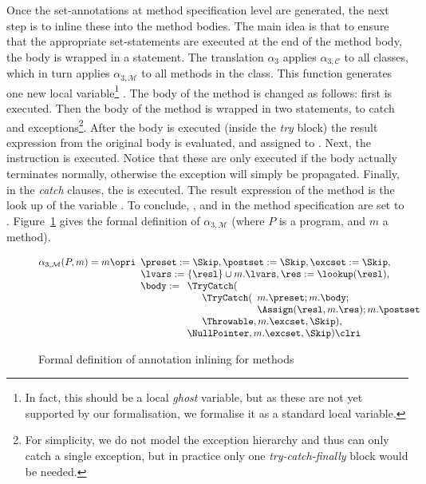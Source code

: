 Once the set-annotations at method specification level are generated,
the next step is to inline these into the method bodies.  The main
idea is that to ensure that the appropriate set-statements are
executed at the end of the method body, the body is wrapped in a
\TryCatch statement. The translation \(\alpha_3\) applies
\(\alpha_{3, \mathcal{C}}\) to all classes, which in turn applies
\(\alpha_{3, \mathcal{M}}\) to all methods in the class. This function
generates one new local variable\footnote{In fact, this should be a
local \emph{ghost} variable, but as these are not yet supported by our
formalisation, we formalise it as a standard local variable.}
\resl. The body of the method is changed as follows: first \preset is
executed. Then the body of the method is wrapped in two \TryCatch
statements, to catch \Throwable and \NullPointer
exceptions\footnote{For simplicity, we do not model the exception
hierarchy and thus \TryCatch can only catch a single exception, but in
practice only one \emph{try-catch-finally} block would be needed.}.  After
the body is executed (inside the \emph{try} block) the result
expression from the original body is evaluated, and assigned to
\resl. Next, the \postset instruction is executed. Notice that these
are only executed if the body actually terminates normally, otherwise
the exception will simply be propagated. Finally, in the \emph{catch}
clauses, the \excset is executed. The result expression of the method
is the look up of the variable \resl. To conclude, \preset,
\postset and
\excset in the method specification are set to
\Skip. Figure~\ref{FigInline} gives the formal definition of
\(\alpha_{3, \mathcal{M}}\) (where \(P\) is a program, and \(m\) a method).

\begin{figure}[t]
\[
\alpha_{3, \mathcal{M}}(P, m) = m \opri
\begin{array}[t]{l}
\preset := \Skip, \postset := \Skip, \excset := \Skip,\\
\lvars := \{\resl\} \cup m.\lvars,
\res := \lookup(\resl), \\
\body :=
\begin{array}[t]{l}
\TryCatch(\\
\quad \begin{array}[t]{l}
  \TryCatch(
  \begin{array}[t]{l}
   m.\preset; m.\body; \\ \Assign(\resl, m.\res); m.\postset\\
  \end{array}\\
  \Throwable, m.\excset, \Skip),
\end{array}\\
\NullPointer, m.\excset, \Skip) \clri
\end{array}
\end{array}
\]
\caption{Formal definition of annotation inlining for methods}\label{FigInline}
\end{figure}


